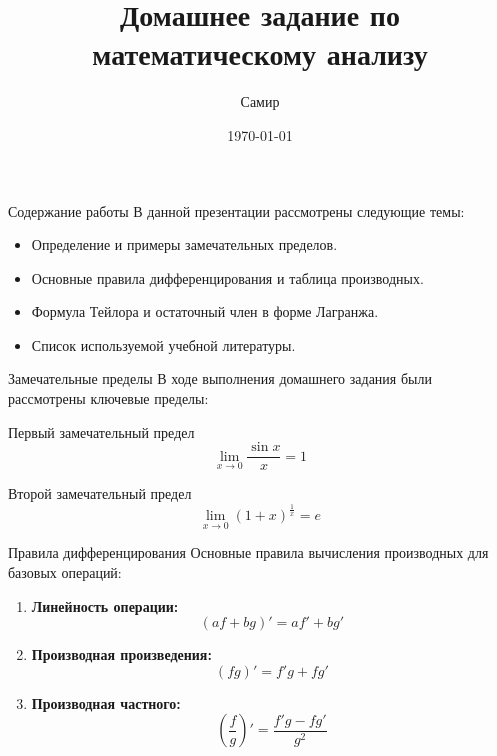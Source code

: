 \documentclass{beamer}
\title{Домашнее задание по математическому анализу}
\author{Самир}
\date{\today}
\begin{document}
\begin{frame}
\maketitle
\end{frame}

\begin{frame}{Содержание работы}
В данной презентации рассмотрены следующие темы:
\begin{itemize}
    \item Определение и примеры замечательных пределов.
    \item Основные правила дифференцирования и таблица производных.
    \item Формула Тейлора и остаточный член в форме Лагранжа.
    \item Список используемой учебной литературы.
\end{itemize}
\end{frame}

\begin{frame}{Замечательные пределы}
В ходе выполнения домашнего задания были рассмотрены ключевые пределы:

\begin{block}{Первый замечательный предел}
\begin{equation}
\lim_{x\to0} \frac{\sin x}{x}=1
\label{eq:slide_sin_limit}  
\end{equation}
\end{block}

\begin{block}{Второй замечательный предел}
\begin{equation}
\lim_{x\to0} (1+x)^\frac{1}{x}=e   
\end{equation}
\end{block}
\end{frame}


\begin{frame}{Правила дифференцирования}
Основные правила вычисления производных для базовых операций:
\begin{enumerate} 
    \item \textbf{Линейность операции:} 
    $$(af + bg)' = af' + bg'$$
    \item \textbf{Производная произведения:} 
    $$(fg)' = f'g + fg'$$
    \item \textbf{Производная частного:} 
    $$\left(\frac{f}{g}\right)' = \frac{f'g - fg'}{g^2}$$
\end{enumerate} 
\end{frame}
\end{document}
